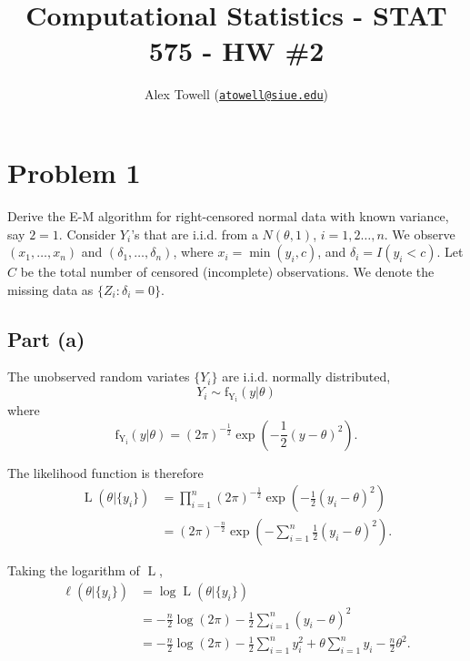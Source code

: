 \documentclass[
]{article}
\title{Computational Statistics - STAT 575 - HW \#2}
\author{Alex Towell
(\href{mailto:atowell@siue.edu}{\nolinkurl{atowell@siue.edu}})}
\date{}
\begin{document}
\maketitle

\newcommand{\var}{\operatorname{Var}}
\newcommand{\expect}{\operatorname{E}}
\newcommand{\cov}{\operatorname{Cov}}
\newcommand{\se}{\operatorname{SE}}
\newcommand{\mat}[1]{\mathbf{#1}} 
\newcommand{\eval}[2]{\left. #1 \right\vert_{#2}}
\newcommand{\poi}{\operatorname{POI}}
\newcommand{\argmax}{\operatorname{arg\,max}}

\hypertarget{problem-1}{%
\section{Problem 1}\label{problem-1}}

Derive the E-M algorithm for right-censored normal data with known
variance, say \(2 = 1\). Consider \(Y_i\)'s that are i.i.d. from a
\(N(\theta, 1)\), \(i=1,2\ldots, n\). We observe \((x_1, \ldots, x_n)\)
and \((\delta_1, \ldots, \delta_n)\), where \(x_i = \min(y_i,c)\), and
\(\delta_i = I(y_i < c)\). Let \(C\) be the total number of censored
(incomplete) observations. We denote the missing data as
\(\{Z_i : \delta_i = 0\}\).

\hypertarget{part-a}{%
\subsection{Part (a)}\label{part-a}}


The unobserved random variates \(\{Y_i\}\) are i.i.d. normally
distributed, \[
  Y_i \sim \operatorname{f_{Y_i}}(y | \theta)
\] where \[
  \operatorname{f_{Y_i}}(y | \theta) = (2 \pi)^{-\frac{1}{2}} \exp\left(-\frac{1}{2}(y - \theta)^2\right).
\]

The likelihood function is therefore \begin{align}
  \operatorname{L}(\theta | \{y_i\})
    &= \prod_{i=1}^{n} (2 \pi)^{-\frac{1}{2}} \exp\left(-\frac{1}{2}(y_i - \theta)^2\right)\\
    &= (2 \pi)^{-\frac{n}{2}} \exp\left(-\sum_{i=1}^{n} \frac{1}{2}(y_i - \theta)^2\right).
\end{align}

Taking the logarithm of \(\operatorname{L}\), \begin{align}
  \ell(\theta | \{y_i\})
    &= \log \operatorname{L}(\theta | \{y_i\})\\
    &= -\frac{n}{2} \log (2 \pi) - \frac{1}{2} \sum_{i=1}^{n} (y_i - \theta)^2\\
    &= -\frac{n}{2} \log (2 \pi) - \frac{1}{2} \sum_{i=1}^{n} y_i^2 + \theta \sum_{i=1}^{n} y_i - \frac{n}{2} \theta^2.
\end{align}
\end{document}
